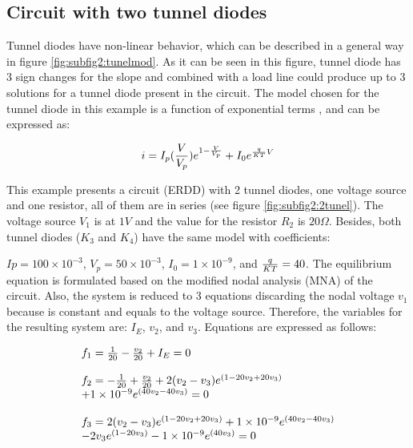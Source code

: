 \documentclass[journal,twocolumn]{IEEEtran}
\begin{document}
\subsection{Circuit with two tunnel diodes}

Tunnel diodes have non-linear behavior, which can be described in a general way in figure \ref{fig:subfig2:tunelmod}. As it can be seen in this figure, tunnel diode has 3 sign changes for the slope and combined with a load line could produce up to 3 solutions for a tunnel diode present in the circuit. The model chosen for the tunnel diode in this example is a function of exponential terms \cite{homo_sze},\cite{homo_shur} and can be expressed as:

\begin{displaymath}
i=I_p({V \over V_p})e^{1-{V \over V_p}}+I_0e^{{q \over {KT}} V}
\end{displaymath}

This example presents a circuit (ERDD) with 2 tunnel diodes, one voltage source and one resistor, all of them are in series (see figure \ref{fig:subfig2:2tunel}). The voltage source $V_1$ is at $1V$ and the value for the resistor $R_2$ is $20\Omega$. Besides, both tunnel diodes ($K_3$ and $K_4$) have the same model with coefficients:

$Ip=100 \times 10^{-3}$,
$V_p=50 \times 10^{-3} $, $I_0=1\times 10^{-9}$, and ${q \over {KT}} = 40$. The equilibrium equation is formulated based on the modified nodal analysis (MNA) of the circuit. Also, the system is reduced to 3 equations discarding the nodal voltage $v_1$ because is constant and equals to the voltage source. Therefore, the variables for the resulting system are: $I_E$, $v_2$, and $v_3$. Equations are expressed as follows:

{\tiny
\begin{equation}
\begin{array}{l}
f_1=  {1 \over 20}-{v_2 \over 20}+I_E =0\\ \\
f_2=  -{1 \over 20}+{v_2 \over 20}+2(v_2-v_3)e^{(1-20v_2+20v_3)} \\ +1\times 10^{-9}e^{(40v_2-40v_3)} =0 \\\\
f_3=  2(v_2-v_3)e^{(1-20v_2+20v_3)}+1\times 10^{-9}e^{(40v_2-40v_3)} \\
-2v_3e^{(1-20v_3)}-1\times 10^{-9} e^{(40v_3)} =0 
\end{array} 
\end{equation}}
\end{document}
